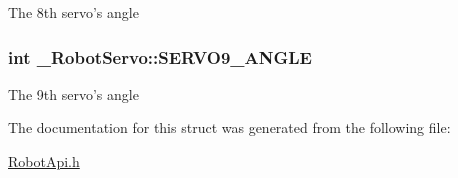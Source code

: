 The 8th servo's angle \hypertarget{struct__RobotServo_a7c262cfcbbf1246556a7f7a23a35275f}{
\subsubsection[{S\-E\-R\-V\-O9\-\_\-\-A\-N\-G\-L\-E}]{\setlength{\rightskip}{0pt plus 5cm}int \-\_\-\-Robot\-Servo\-::\-S\-E\-R\-V\-O9\-\_\-\-A\-N\-G\-L\-E}}\label{struct__RobotServo_a7c262cfcbbf1246556a7f7a23a35275f}
The 9th servo's angle 

The documentation for this struct was generated from the following file\-:\begin{DoxyCompactItemize}
\item 
\hyperlink{RobotApi_8h}{Robot\-Api.\-h}\end{DoxyCompactItemize}
